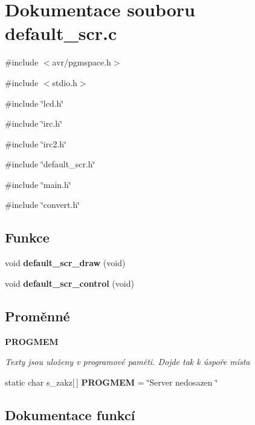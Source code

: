 \section{Dokumentace souboru default\_\-scr.c}
\label{default__scr_8c}
{\ttfamily \#include $<$avr/pgmspace.h$>$}\par
{\ttfamily \#include $<$stdio.h$>$}\par
{\ttfamily \#include \char`\"{}lcd.h\char`\"{}}\par
{\ttfamily \#include \char`\"{}irc.h\char`\"{}}\par
{\ttfamily \#include \char`\"{}irc2.h\char`\"{}}\par
{\ttfamily \#include \char`\"{}default\_\-scr.h\char`\"{}}\par
{\ttfamily \#include \char`\"{}main.h\char`\"{}}\par
{\ttfamily \#include \char`\"{}convert.h\char`\"{}}\par
\subsection*{Funkce}
\begin{DoxyCompactItemize}
\item 
void {\bf default\_\-scr\_\-draw} (void)
\item 
void {\bf default\_\-scr\_\-control} (void)
\end{DoxyCompactItemize}
\subsection*{Proměnné}
\begin{Indent}{\bf PROGMEM}\par
{\em \label{_amgrp6abfdb53323da51d8bdb0602052a1543}
 Texty jsou uloženy v programové paměti. Dojde tak k úspoře místa }\begin{DoxyCompactItemize}
\item 
static char s\_\-zakz[$\,$] {\bf PROGMEM} = \char`\"{}Server nedosazen \char`\"{}
\end{DoxyCompactItemize}
\end{Indent}


\subsection{Dokumentace funkcí}
